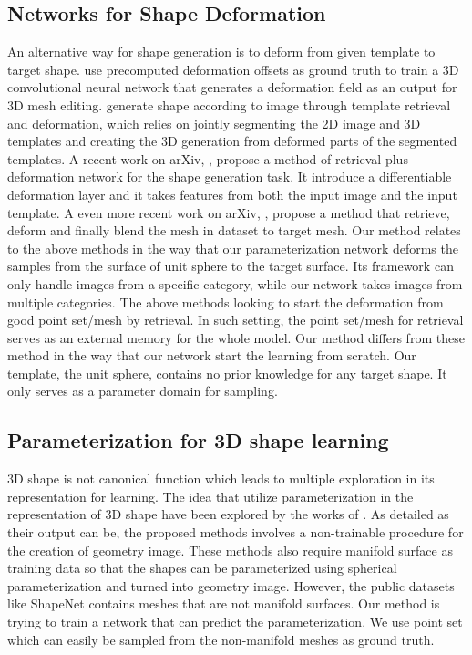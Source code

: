 \subsection{Networks for Shape Deformation}
An alternative way for shape generation is to deform from given template to target shape. \citep{deformflow} use precomputed deformation offsets as ground truth to train a 3D convolutional neural network that generates a deformation field as an output for 3D mesh editing. \citep{Huang:2015:SRV:2809654.2766890} generate shape according to image through template retrieval and
deformation, which relies on jointly segmenting the 2D image and 3D templates and creating the 
3D generation from deformed parts of the segmented templates. A recent work on arXiv, \citep{deformnet}, propose a method of retrieval plus deformation network for the shape generation task. It introduce a differentiable deformation layer and it takes features from both the input image and the input template.
A even more recent work on arXiv, \citep{img2mesh}, propose a method that retrieve, deform and finally blend the mesh in dataset to target mesh. 
Our method relates to the above methods in the way that our parameterization network deforms the samples from the surface of unit sphere to the target surface. Its framework can only handle images from a specific category, while our network takes images from multiple categories.  
The above methods looking to start the deformation from good point set/mesh by retrieval. In such setting, the point set/mesh for retrieval serves as an external memory for the whole model. 
Our method differs from these method in the way that our network start the learning from scratch. Our template, the unit sphere, contains no prior knowledge for any target shape. It only serves as a parameter domain for sampling.
  
\subsection{Parameterization for 3D shape learning}
3D shape is not canonical function which leads to multiple exploration in its representation for learning. The idea that utilize parameterization in the representation of 3D shape have been explored by the works of \citep{surfnet}\citep{geoimg}. As detailed as their output can be, the proposed methods involves a non-trainable procedure for the creation of geometry image. These methods also require manifold surface as training data so that the shapes can be parameterized using spherical parameterization and turned into geometry image. However, the public datasets like ShapeNet\citep{shapenetdata} contains meshes that are not manifold surfaces. Our method is trying to train a network that can predict the parameterization. We use point set which can easily be sampled from the non-manifold meshes as ground truth. 
